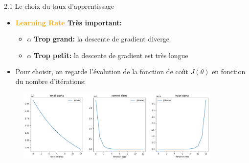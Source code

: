 \begin{frame}{2.1 Le choix du taux d'apprentissage}
  \begin{itemize}
  \item \textbf{\textcolor{orange}{Learning Rate} Très important:}
    \begin{itemize}
      \normalsize
    \item \boldmath $\alpha$ \textbf{Trop grand:} la descente de gradient diverge
    \item \boldmath $\alpha$ \textbf{Trop petit:} la descente de gradient est très longue
    \end{itemize}
  \item Pour choisir, on regarde l'évolution de la fonction de coût $J(\theta)$ en fonction du nombre d'itérations:
  \end{itemize}
  \vspace{-0.5cm}
  \begin{figure}
    \includegraphics[width=0.9\textwidth]{fig/learningRateChoice.png}
  \end{figure}
\end{frame}

